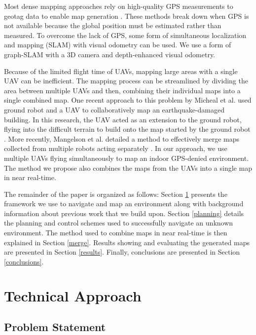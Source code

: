 \documentclass[letterpaper, 10 pt, conference]{ieeeconf}  %
\begin{document}
Most dense mapping approaches rely on high-quality GPS measurements to geotag data to enable map generation \cite{Siebert2014, Martin2015}. These methods break down when GPS is not available because the global position must be estimated rather than measured. To overcome the lack of GPS, some form of simultaneous localization and mapping (SLAM) with visual odometry can be used. We use a form of graph-SLAM with a 3D camera and depth-enhanced visual odometry.

Because of the limited flight time of UAVs, mapping large areas with a single UAV can be inefficient. The mapping process can be streamlined by dividing the area between multiple UAVs and then, combining their individual maps into a single combined map. One recent approach to this problem by Micheal et al. used ground robot and a UAV to collaboratively map an earthquake-damaged building. In this research, the UAV acted as an extension to the ground robot, flying into the difficult terrain to build onto the map started by the ground robot \cite{Michael2012}. More recently, Mangelson et al. detailed a method to effectively merge maps collected from multiple robots acting separately \cite{Mangelson2018}. In our approach, we use multiple UAVs flying simultaneously to map an indoor GPS-denied environment. The method we propose also combines the maps from the UAVs into a single map in near real-time.

The remainder of the paper is organized as follows: Section \ref{approach} presents the framework we use to navigate and map an environment along with background information about previous work that we build upon. Section \ref{planning} details the planning and control schemes used to successfully navigate an unknown environment. The method used to combine maps in near real-time is then explained in Section \ref{merge}. Results showing and evaluating the generated maps are presented in Section \ref{results}. Finally, conclusions are presented in Section \ref{conclusions}.

\section{Technical Approach}\label{approach}

\subsection{Problem Statement}
\end{document}
